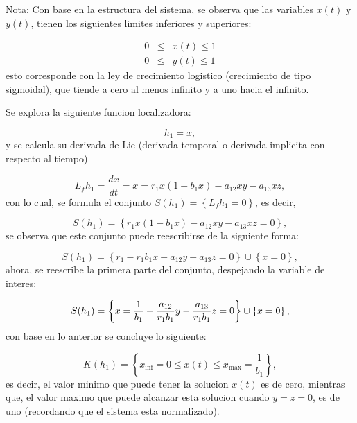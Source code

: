 \documentclass[letterpaper,11pt]{article}
\begin{document}
Nota: Con base en la estructura del sistema, se observa que las variables $%
x(t)$ y $y\left( t\right) $, tienen los siguientes limites inferiores y
superiores:

\begin{eqnarray*}
0 &\leq &x\left( t\right) \leq 1 \\
0 &\leq &y\left( t\right) \leq 1
\end{eqnarray*}%
esto corresponde con la ley de crecimiento logistico (crecimiento de tipo
sigmoidal), que tiende a cero al menos infinito y a uno hacia el infinito.

Se explora la siguiente funcion localizadora:

\begin{equation*}
h_{1}=x,
\end{equation*}%
y se calcula su derivada de Lie (derivada temporal o derivada implicita con
respecto al tiempo)

\begin{equation*}
L_{f}h_{1}=\frac{dx}{dt}=\dot{x}=r_{1}x(1-b_{1}x)-a_{12}xy-a_{13}xz,
\end{equation*}%
con lo cual, se formula el conjunto $S\left( h_{1}\right) =\left\{
L_{f}h_{1}=0\right\} $, es decir,

\begin{equation*}
S(h_{1})=\left\{ r_{1}x(1-b_{1}x)-a_{12}xy-a_{13}xz=0\right\} ,
\end{equation*}
$\allowbreak $se observa que este conjunto puede reescribirse de la
siguiente forma:

\begin{equation*}
S(h_{1})=\left\{ r_{1}-r_{1}b_{1}x-a_{12}y-a_{13}z=0\right\} \cup \left\{
x=0\right\} ,
\end{equation*}%
ahora, se reescribe la primera parte del conjunto, despejando la variable de
interes:

\begin{equation*}
S(h_{1})=\left\{ x=\frac{1}{b_{1}}-\frac{a_{12}}{r_{1}b_{1}}y-\frac{a_{13}}{%
r_{1}b_{1}}z=0\right\} \cup \left\{ x=0\right\} ,
\end{equation*}%
con base en lo anterior se concluye lo siguiente:

\begin{equation*}
K\left( h_{1}\right) =\left\{ x_{\inf }=0\leq x\left( t\right) \leq x_{\max
}=\frac{1}{b_{1}}\right\} ,
\end{equation*}%
es decir, el valor minimo que puede tener la solucion $x\left( t\right) $ es
de cero, mientras que, el valor maximo que puede alcanzar esta solucion
cuando $y=z=0$, es de uno (recordando que el sistema esta normalizado).
\end{document}
